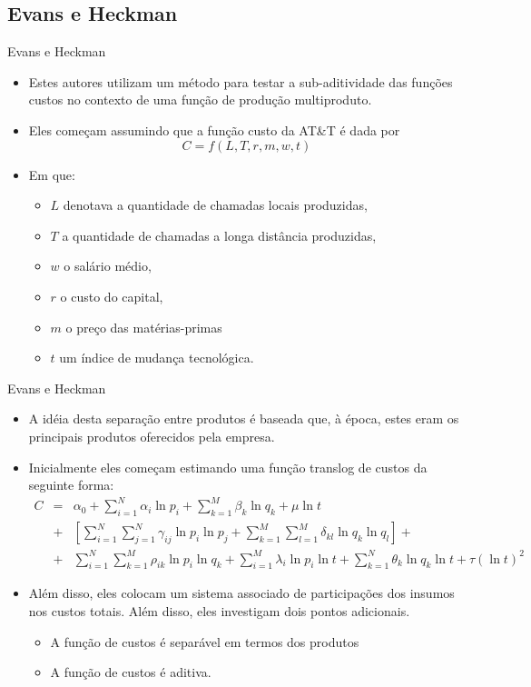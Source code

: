 \documentclass{beamer}
\begin{document}
\subsection{Evans e Heckman}
\begin{frame}{Evans e Heckman}

\begin{itemize}
\item Estes autores utilizam um método para testar a sub-aditividade das
funções custos no contexto de uma função de produção multiproduto. 
\item Eles começam assumindo que a função custo da AT\&T é dada por
\[
C=f(L,T,r,m,w,t)
\]
\item Em que: 

\begin{itemize}
\item $L$ denotava a quantidade de chamadas locais produzidas, 
\item $T$ a quantidade de chamadas a longa distância produzidas, 
\item $w$ o salário médio,
\item $r$ o custo do capital, 
\item $m$ o preço das matérias-primas 
\item $t$ um índice de mudança tecnológica. 
\end{itemize}
\end{itemize}
\end{frame}

\begin{frame}{Evans e Heckman}
\tiny
\begin{itemize}
\item A idéia desta separação entre produtos é baseada que, à época, estes
eram os principais produtos oferecidos pela empresa. 
\item Inicialmente eles começam estimando uma função translog de custos
da seguinte forma:
\begin{eqnarray*}
C & = & \alpha_{0}+\sum_{i=1}^{N}\alpha_{i}\ln p_{i}+\sum_{k=1}^{M}\beta_{k}\ln q_{k}+\mu\ln t\\
 & + & \left[\sum_{i=1}^{N}\sum_{j=1}^{N}\gamma_{ij}\ln p_{i}\ln p_{j}+\sum_{k=1}^{M}\sum_{l=1}^{M}\delta_{kl}\ln q_{k}\ln q_{l}\right]+\\
 & + & \sum_{i=1}^{N}\sum_{k=1}^{M}\rho_{ik}\ln p_{i}\ln q_{k}+\sum_{i=1}^{M}\lambda_{i}\ln p_{i}\ln t+\sum_{k=1}^{N}\theta_{k}\ln q_{k}\ln t+\tau(\ln t)^{2}
\end{eqnarray*}
\item Além disso, eles colocam um sistema associado de participações dos
insumos nos custos totais. Além disso, eles investigam dois pontos
adicionais. 
\begin{itemize}
\item A função de custos é separável em termos dos produtos 
\item A função de custos é aditiva. 
\end{itemize}
\end{itemize}
\end{frame}
\end{document}
